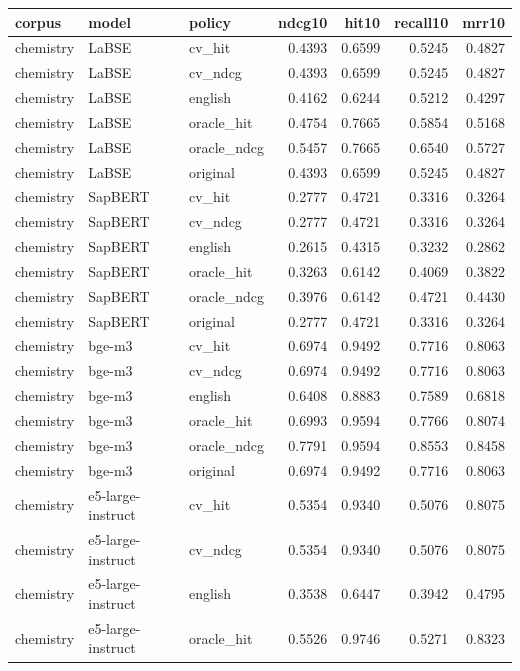\begin{tabular}{lllrrrr}
\toprule
corpus & model & policy & ndcg10 & hit10 & recall10 & mrr10 \\
\midrule
chemistry & LaBSE & cv\_hit & 0.4393 & 0.6599 & 0.5245 & 0.4827 \\
chemistry & LaBSE & cv\_ndcg & 0.4393 & 0.6599 & 0.5245 & 0.4827 \\
chemistry & LaBSE & english & 0.4162 & 0.6244 & 0.5212 & 0.4297 \\
chemistry & LaBSE & oracle\_hit & 0.4754 & 0.7665 & 0.5854 & 0.5168 \\
chemistry & LaBSE & oracle\_ndcg & 0.5457 & 0.7665 & 0.6540 & 0.5727 \\
chemistry & LaBSE & original & 0.4393 & 0.6599 & 0.5245 & 0.4827 \\
chemistry & SapBERT & cv\_hit & 0.2777 & 0.4721 & 0.3316 & 0.3264 \\
chemistry & SapBERT & cv\_ndcg & 0.2777 & 0.4721 & 0.3316 & 0.3264 \\
chemistry & SapBERT & english & 0.2615 & 0.4315 & 0.3232 & 0.2862 \\
chemistry & SapBERT & oracle\_hit & 0.3263 & 0.6142 & 0.4069 & 0.3822 \\
chemistry & SapBERT & oracle\_ndcg & 0.3976 & 0.6142 & 0.4721 & 0.4430 \\
chemistry & SapBERT & original & 0.2777 & 0.4721 & 0.3316 & 0.3264 \\
chemistry & bge-m3 & cv\_hit & 0.6974 & 0.9492 & 0.7716 & 0.8063 \\
chemistry & bge-m3 & cv\_ndcg & 0.6974 & 0.9492 & 0.7716 & 0.8063 \\
chemistry & bge-m3 & english & 0.6408 & 0.8883 & 0.7589 & 0.6818 \\
chemistry & bge-m3 & oracle\_hit & 0.6993 & 0.9594 & 0.7766 & 0.8074 \\
chemistry & bge-m3 & oracle\_ndcg & 0.7791 & 0.9594 & 0.8553 & 0.8458 \\
chemistry & bge-m3 & original & 0.6974 & 0.9492 & 0.7716 & 0.8063 \\
chemistry & e5-large-instruct & cv\_hit & 0.5354 & 0.9340 & 0.5076 & 0.8075 \\
chemistry & e5-large-instruct & cv\_ndcg & 0.5354 & 0.9340 & 0.5076 & 0.8075 \\
chemistry & e5-large-instruct & english & 0.3538 & 0.6447 & 0.3942 & 0.4795 \\
chemistry & e5-large-instruct & oracle\_hit & 0.5526 & 0.9746 & 0.5271 & 0.8323 \\

\end{tabular}
